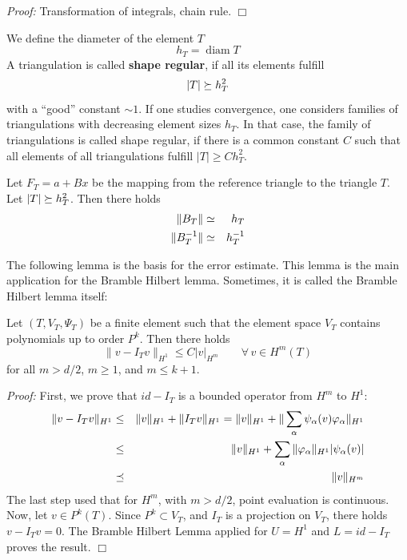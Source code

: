 {\em Proof:} Transformation of integrals, chain rule. \hfill $\Box$


\bigskip
We define the diameter of the element $T$
$$
h_T = \operatorname{diam} T 
$$
A triangulation is called {\bf shape regular}, if all its elements fulfill
$$
| T | \succeq h_T^2
$$
with a ``good'' constant $\sim 1$. If one studies convergence, one considers families
of triangulations with decreasing element sizes $h_T$. In that case, the family
of triangulations is called shape regular, if there is a common constant $C$ such that 
all elements of all triangulations fulfill $| T | \geq C h_T^2$.


\begin{lemma} Let $F_T = a + B x$ be the mapping from the reference triangle
to the triangle $T$. Let $|T| \succeq h_T^2$. Then there holds
\begin{eqnarray*}
\| B_T \| & \simeq & h_T \\
\| B_T^{-1} \| & \simeq & h_T^{-1}
\end{eqnarray*}
\end{lemma}


The following lemma is the basis for the error estimate. This lemma is the main
application for the Bramble Hilbert lemma. Sometimes, it is called 
the Bramble Hilbert lemma itself:
\begin{lemma}
Let $(T, V_T, \Psi_T)$ be a finite element such that
the element space $V_T$ contains polynomials up to order $P^k$. 
Then there holds
$$
\| v - I_T v \|_{H^1} \leq C | v |_{H^m} \qquad \forall \, v \in H^m(T)
$$
for all $m > d/2$, $m \geq 1$, and $m \leq k+1$.
\end{lemma}
{\em Proof:} First, we prove that $id - I_T$ is a bounded operator
from $H^m$ to $H^1$:
\begin{eqnarray*}
\| v - I_T v \|_{H^1} & \leq & \| v \|_{H^1} + \| I_T v \|_{H^1}
        =  \| v \|_{H^1} + \| \sum_{\alpha} \psi_\alpha(v) \varphi_\alpha \|_{H^1}
 \\
& \leq & \| v \|_{H^1} + \sum_\alpha \| \varphi_\alpha \|_{H^1} | \psi_\alpha(v) | \\
& \preceq & \| v \|_{H^m}
\end{eqnarray*}
The last step used that for $H^m$, with $m > d/2$, point evaluation is continuous.
Now, let $v \in P^k(T)$. Since $P^k \subset V_T$, and $I_T$ is a projection on $V_T$, 
there holds $v - I_T v = 0$. The Bramble Hilbert Lemma applied for $U = H^1$ and
$L = id - I_T$ proves the result.
\hfill $\Box$



